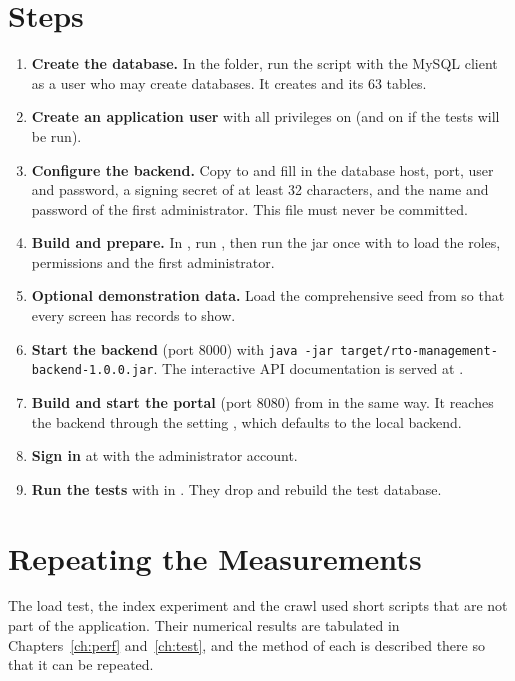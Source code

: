 \section{Steps}
\begin{enumerate}
\item \textbf{Create the database.} In the  folder, run the script  with the MySQL client as a user who may create databases. It creates  and its 63 tables.
\item \textbf{Create an application user} with all privileges on  (and on  if the tests will be run).
\item \textbf{Configure the backend.} Copy  to  and fill in the database host, port, user and password, a signing secret of at least 32 characters, and the name and password of the first administrator. This file must never be committed.
\item \textbf{Build and prepare.} In , run , then run the jar once with  to load the roles, permissions and the first administrator.
\item \textbf{Optional demonstration data.} Load the comprehensive seed from  so that every screen has records to show.
\item \textbf{Start the backend} (port 8000) with \texttt{java -jar target/\allowbreak{}rto-management-\allowbreak{}backend-1.0.0.jar}. The interactive API documentation is served at .
\item \textbf{Build and start the portal} (port 8080) from  in the same way. It reaches the backend through the setting , which defaults to the local backend.
\item \textbf{Sign in} at  with the administrator account.
\item \textbf{Run the tests} with  in . They drop and rebuild the test database.
\end{enumerate}

\section{Repeating the Measurements}
The load test, the index experiment and the crawl used short scripts that are not part of
the application. Their numerical results are tabulated in Chapters~\ref{ch:perf}
and~\ref{ch:test}, and the method of each is described there so that it can be repeated.
